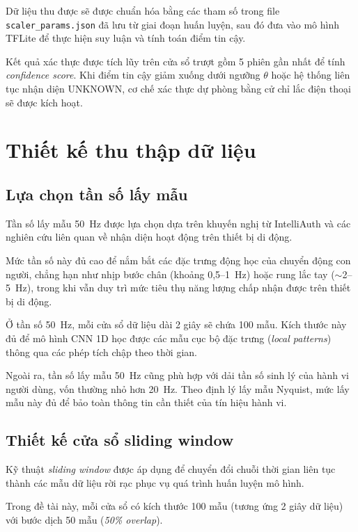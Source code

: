 \documentclass[../DoAn.tex]{subfiles}
\begin{document}
    Dữ liệu thu được sẽ được chuẩn hóa bằng các tham số trong file \texttt{scaler\_params.json} đã lưu từ giai đoạn huấn luyện, sau đó đưa vào mô hình TFLite để thực hiện suy luận và tính toán điểm tin cậy.
    
    Kết quả xác thực được tích lũy trên cửa sổ trượt gồm 5 phiên gần nhất để tính \textit{confidence score}. Khi điểm tin cậy giảm xuống dưới ngưỡng $\theta$ hoặc hệ thống liên tục nhận diện UNKNOWN, cơ chế xác thực dự phòng bằng cử chỉ lắc điện thoại sẽ được kích hoạt.

    \section{Thiết kế thu thập dữ liệu}

    \subsection{Lựa chọn tần số lấy mẫu}
    
    Tần số lấy mẫu 50~Hz được lựa chọn dựa trên khuyến nghị từ IntelliAuth và các nghiên cứu liên quan về nhận diện hoạt động trên thiết bị di động.
    
    Mức tần số này đủ cao để nắm bắt các đặc trưng động học của chuyển động con người, chẳng hạn như nhịp bước chân (khoảng 0,5--1~Hz) hoặc rung lắc tay ($\sim$2--5~Hz), trong khi vẫn duy trì mức tiêu thụ năng lượng chấp nhận được trên thiết bị di động.
    
    Ở tần số 50~Hz, mỗi cửa sổ dữ liệu dài 2 giây sẽ chứa 100 mẫu. Kích thước này đủ để mô hình CNN 1D học được các mẫu cục bộ đặc trưng (\textit{local patterns}) thông qua các phép tích chập theo thời gian.
    
    Ngoài ra, tần số lấy mẫu 50~Hz cũng phù hợp với dải tần số sinh lý của hành vi người dùng, vốn thường nhỏ hơn 20~Hz. Theo định lý lấy mẫu Nyquist, mức lấy mẫu này đủ để bảo toàn thông tin cần thiết của tín hiệu hành vi.

    \subsection{Thiết kế cửa sổ sliding window}

    Kỹ thuật \textit{sliding window} được áp dụng để chuyển đổi chuỗi thời gian liên tục thành các mẫu dữ liệu rời rạc phục vụ quá trình huấn luyện mô hình.
    
    Trong đề tài này, mỗi cửa sổ có kích thước 100 mẫu (tương ứng 2 giây dữ liệu) với bước dịch 50 mẫu (\textit{50\% overlap}).
    
\end{document}
